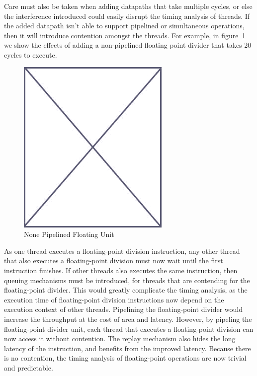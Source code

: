 Care must also be taken when adding datapaths that take multiple cycles, or else the interference introduced could easily disrupt the timing analysis of threads.
If the added datapath isn't able to support pipelined or simultaneous operations, then it will introduce contention amongst the threads.
For example, in figure~\ref{fig:none_pipelined_floatingpoint} we show the effects of adding a non-pipelined floating point divider that takes 20 cycles to execute.    
\begin{figure}
\begin{center}
\includegraphics[scale=.4]{figs/placeholder}
\end{center}
\caption{None Pipelined Floating Unit}
\label{fig:none_pipelined_floatingpoint}
\end{figure}
As one thread executes a floating-point division instruction, any other thread that also executes a floating-point division must now wait until the first instruction finishes. 
If other threads also executes the same instruction, then queuing mechanisms must be introduced, for threads that are contending for the floating-point divider. 
This would greatly complicate the timing analysis, as the execution time of floating-point division instructions now depend on the execution context of other threads.
Pipelining the floating-point divider would increase the throughput at the cost of area and latency. 
However, by pipeling the floating-point divider unit, each thread that executes a floating-point division can now access it without contention. 
The replay mechanism also hides the long latency of the instruction, and benefits from the improved latency. 
Because there is no contention, the timing analysis of floating-point operations are now trivial and predictable.     

